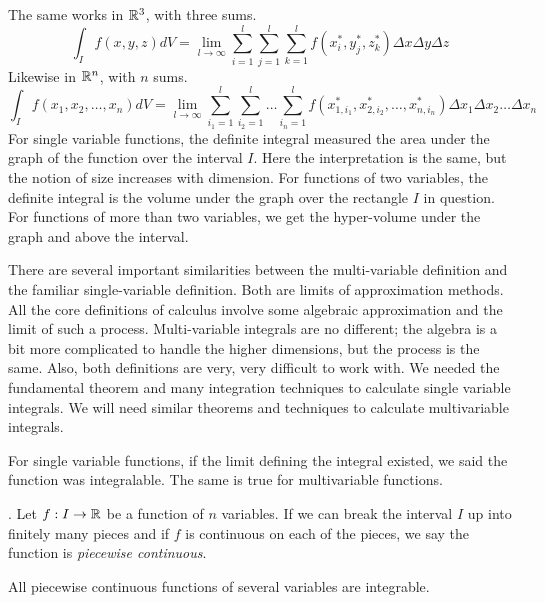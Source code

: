 \documentclass[fleqn,letterpaper]{report}
\begin{document}
The same works in $\mathbb{R}^3$, with three sums.
\begin{equation*}
\int_{I} f(x,y,z) dV = \lim_{l \rightarrow \infty}
\sum_{i=1}^l \sum_{j=1}^l \sum_{k=1}^l f(x_i^*,y_j^*,z_k^*)
\Delta x \Delta y \Delta z
\end{equation*}
Likewise in $\mathbb{R}^n$, with $n$ sums.
\begin{equation*}
\int_{I} f(x_1,x_2, \ldots, x_n) dV = \lim_{l \rightarrow \infty}
\sum_{i_1=1}^l \sum_{i_2=1}^l \ldots \sum_{i_n=1}^l
f(x_{1,i_1}^*,x_{2,i_2}^*, \ldots ,x_{n,i_n}^*)
\Delta x_1 \Delta x_2 \ldots \Delta x_n
\end{equation*}
For single variable functions, the definite integral measured
the area under the graph of the function over the interval
$I$. Here the interpretation is the same, but the notion of
size increases with dimension. For functions of two
variables, the definite integral is the volume under the graph
over the rectangle $I$ in question. For functions of more
than two variables, we get the hyper-volume under the graph
and above the interval.

There are several important similarities between the 
multi-variable definition and the familiar single-variable
definition. Both are limits of approximation methods. All
the core definitions of calculus involve some algebraic
approximation and the limit of such a process. Multi-variable
integrals are no different; the algebra is a bit more
complicated to handle the higher dimensions, but the process
is the same. Also, both definitions are very, very difficult
to work with. We needed the fundamental theorem and many
integration techniques to calculate
single variable integrals. We will need similar theorems and
techniques to calculate multivariable integrals.

For single variable functions, if the limit defining the
integral existed, we said the function was integralable. The
same is true for multivariable functions. 

\begin{defn}. Let $f: I \rightarrow \mathbb{R}$ be a function of
$n$ variables. If we can break the interval $I$ up into finitely
many pieces and if $f$ is continuous on each of the pieces, we
say the function is \emph{piecewise continuous}.
\end{defn}

\begin{prop}
All piecewise continuous functions of several variables are integrable.
\end{prop}
\end{document}
